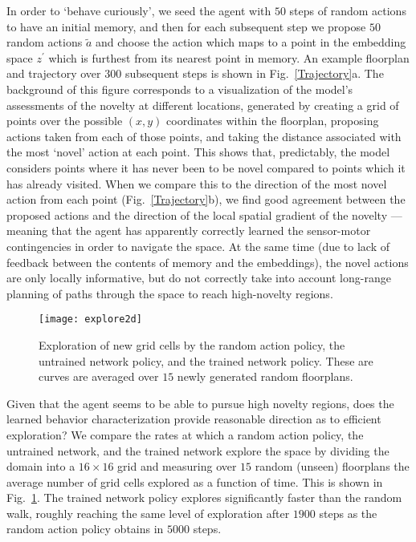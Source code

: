 \documentclass[letterpaper]{article}
\begin{document}
In order to `behave curiously', we seed the agent with $50$ steps of random actions to have an initial memory, and then for each subsequent step we propose $50$ random actions $\tilde{a}$ and choose the action which maps to a point in the embedding space $z^\prime$ which is furthest from its nearest point in memory. An example floorplan and trajectory over 300 subsequent steps is shown in Fig.~\ref{Trajectory}a. The background of this figure corresponds to a visualization of the model's assessments of the novelty at different locations, generated by creating a grid of points over the possible $(x,y)$ coordinates within the floorplan, proposing actions taken from each of those points, and taking the distance associated with the most `novel' action at each point. This shows that, predictably, the model considers points where it has never been to be novel compared to points which it has already visited. When we compare this to the direction of the most novel action from each point (Fig.~\ref{Trajectory}b), we find good agreement between the proposed actions and the direction of the local spatial gradient of the novelty --- meaning that the agent has apparently correctly learned the sensor-motor contingencies in order to navigate the space. At the same time (due to lack of feedback between the contents of memory and the embeddings), the novel actions are only locally informative, but do not correctly take into account long-range planning of paths through the space to reach high-novelty regions.

\begin{figure}
 \texttt{[image: explore2d]}
 \caption{\label{Exploration} Exploration of new grid cells by the random action policy, the untrained network policy, and the trained network policy. These are curves are averaged over $15$ newly generated random floorplans. }
\end{figure}

Given that the agent seems to be able to pursue high novelty regions, does the learned behavior characterization provide reasonable direction as to efficient exploration? We compare the rates at which a random action policy, the untrained network, and the trained network explore the space by dividing the domain into a $16 \times 16$ grid and measuring over $15$ random (unseen) floorplans the average number of grid cells explored as a function of time. This is shown in Fig.~\ref{Exploration}. The trained network policy explores significantly faster than the random walk, roughly reaching the same level of exploration after $1900$ steps as the random action policy obtains in $5000$ steps.
\end{document}
